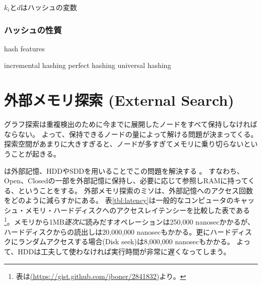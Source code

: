 $k_i$と$d$はハッシュの変数

\subsubsection{ハッシュの性質}

{\TODO hash features}

incremental hashing
perfect hashing
universal hashing








\section{外部メモリ探索 (External Search)}
\label{sec:external-search}


グラフ探索は重複検出のために今までに展開したノードをすべて保持しなければならない。
よって、保持できるノードの量によって解ける問題が決まってくる。
探索空間があまりに大きすぎると、ノードが多すぎてメモリに乗り切らないということが起きる。

は外部記憶、HDDやSDDを用いることでこの問題を解決する \cite{chiang1995external}。
すなわち、Open、Closedの一部を外部記憶に保持し、必要に応じて参照しRAMに持ってくる、ということをする。
外部メモリ探索のミソは、外部記憶へのアクセス回数をどのように減らすかにある。
表\ref{tbl:latency}は一般的なコンピュータのキャッシュ・メモリ・ハードディスクへのアクセスレイテンシーを比較した表である\footnote{表は\url{(https://gist.github.com/jboner/2841832)}より。}。メモリから1MB{\it 逐次に}読みだすオペレーションは250,000 nanosecかかるが、ハードディスクからの読出しは20,000,000 nanosecもかかる。更にハードディスクにランダムアクセスする場合(Disk seek)は8,000,000 nanosecもかかる。
よって、HDDは工夫して使わなければ実行時間が非常に遅くなってしまう。%

